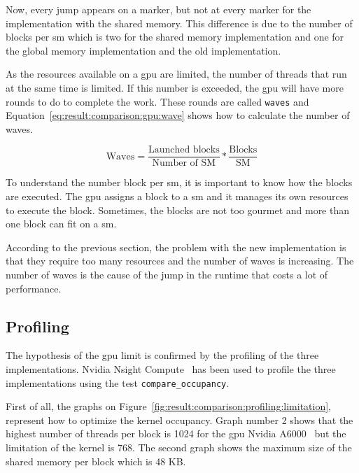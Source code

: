 Now, every jump appears on a marker, but not at every marker for the implementation
with the shared memory.
This difference is due to the number of blocks per \acrshort{sm} which is two for
the shared memory implementation and one for the global memory implementation
and the old implementation.

As the resources available on a \acrshort{gpu} are limited, the number of
threads that run at the same time is limited.
If this number is exceeded, the \acrshort{gpu} will have more rounds to do to
complete the work.
These rounds are called \texttt{waves} and Equation~\ref{eq:result:comparison:gpu:wave}
shows how to calculate the number of waves.

\begin{equation}
    \text{Waves} = \frac{\text{Launched blocks}}{\text{Number of SM}} * \frac{\text{Blocks}}{\text{SM}}
    \label{eq:result:comparison:gpu:wave}
\end{equation}

To understand the number block per \acrshort{sm}, it is important to know how
the blocks are executed.
The \acrshort{gpu} assigns a block to a \acrshort{sm} and it manages its own
resources to execute the block.
Sometimes, the blocks are not too gourmet and more than one block can fit on
a \acrshort{sm}.

According to the previous section, the problem with the new implementation is
that they require too many resources and the number of waves is increasing.
The number of waves is the cause of the jump in the runtime that costs a lot of
performance.


\subsection{Profiling}
\label{ch:result:comparison:profiling}

The hypothesis of the \acrshort{gpu} limit is confirmed by the profiling of the
three implementations.
Nvidia Nsight Compute~\cite{nsight-compute} has been used to profile the three
implementations using the test \texttt{compare\_occupancy}.

First of all, the graphs on Figure~\ref{fig:result:comparison:profiling:limitation},
represent how to optimize the kernel occupancy.
Graph number 2 shows that the highest number of threads per block is 1024
for the \acrshort{gpu} Nvidia A6000~\cite{nvidia-a6000} but the limitation of
the kernel is 768.
The second graph shows the maximum size of the shared memory per block which is
48 KB.


